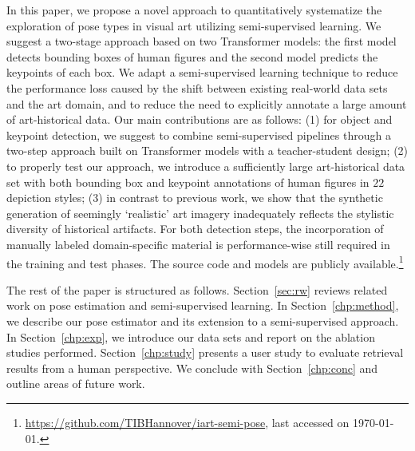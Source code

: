 \documentclass[sigconf]{acmart}
\begin{document}
In this paper, we propose a novel approach to quantitatively systematize the exploration of pose types in visual art utilizing semi-supervised learning. We suggest a two-stage approach based on two Transformer models: the first model detects bounding boxes of human figures and the second model predicts the keypoints of each box. 
We adapt a semi-supervised learning technique to reduce the performance loss caused by the shift between existing real-world data sets and the art domain, and to reduce the need to explicitly annotate a large amount of art-historical data. 
Our main contributions are as follows: 
(1) for object and keypoint detection, we suggest to combine semi-supervised pipelines through a two-step approach built on Transformer models with a teacher-student design; 
(2) to properly test our approach, we introduce a sufficiently large art-historical data set with both bounding box and keypoint annotations of human figures in $22$ depiction styles; 
(3) in contrast to previous work, we show that the synthetic generation of seemingly \enquote*{realistic} art imagery inadequately reflects the stylistic diversity of historical artifacts. 
For both detection steps, the incorporation of manually labeled domain-specific material is performance-wise still required in the training and test phases.
The source code and models are publicly available.\footnote{\url{https://github.com/TIBHannover/iart-semi-pose}, last accessed on \today.}

The rest of the paper is structured as follows. Section~\ref{sec:rw} reviews related work on pose estimation and semi-supervised learning. In Section~\ref{chp:method}, we describe our pose estimator and its extension to a semi-supervised approach. 
In Section~\ref{chp:exp}, we introduce our data sets and report on the ablation studies performed.
Section~\ref{chp:study} presents a user study to evaluate retrieval results from a human perspective. We conclude with Section~\ref{chp:conc} and outline areas of future work.
\end{document}
